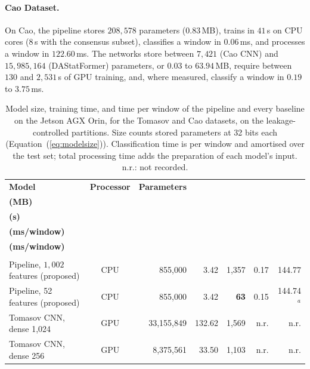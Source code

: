 \paragraph[Cao Dataset]{Cao Dataset.}
On Cao, the pipeline stores $208{,}578$ parameters ($0.83$\,MB), trains in $41$\,s on CPU cores ($8$\,s with the consensus subset), classifies a window in $0.06$\,ms, and processes a window in $122.60$\,ms. The networks store between $7{,}421$ (Cao CNN) and $15{,}985{,}164$ (DAStatFormer) parameters, or $0.03$ to $63.94$\,MB, require between $130$ and $2{,}531$\,s of GPU training, and, where measured, classify a window in $0.19$ to $3.75$\,ms.

\begin{table}[!htbp]
	\centering
	\caption[Model size, training time, and time per window of the pipeline and every baseline]{Model size, training time, and time per window of the pipeline and every baseline on the Jetson AGX Orin, for the Tomasov and Cao datasets, on the leakage-controlled partitions. Size counts stored parameters at 32 bits each (Equation~(\ref{eq:modelsize})). Classification time is per window and amortised over the test set; total processing time adds the preparation of each model's input. n.r.: not recorded.}
	\label{tab:footprint}
	\footnotesize
	\setlength{\tabcolsep}{3pt}
	\begin{tabularx}{\textwidth}{@{}>{\raggedright\arraybackslash}X c r r r r r@{}}
		\toprule
		\textbf{Model} & \textbf{Processor} & \textbf{Parameters} & \makecell[r]{\textbf{Size}\\\textbf{(MB)}} & \makecell[r]{\textbf{Training}\\\textbf{(s)}} & \makecell[r]{\textbf{Classification}\\\textbf{(ms/window)}} & \makecell[r]{\textbf{Total}\\\textbf{(ms/window)}}\\
		\midrule
		\multicolumn{7}{@{}l}{\textit{Tomasov \etal\ 2025}}\\[2pt]
		Pipeline, $1{,}002$ features (proposed) & CPU & 855{,}000 & 3.42 & 1{,}357 & 0.17 & 144.77\\
		Pipeline, 52 features (proposed) & CPU & 855{,}000 & 3.42 & \textbf{63} & 0.15 & 144.74$^{a}$\\
		Tomasov CNN, dense 1{,}024~\cite{tomasov2025perimeter} & GPU & 33{,}155{,}849 & 132.62 & 1{,}569 & n.r. & n.r.\\
		Tomasov CNN, dense 256~\cite{tomasov2025perimeter}  & GPU & 8{,}375{,}561 & 33.50 & 1{,}103 & n.r. & n.r.\\

\end{tabularx}
\end{table}
